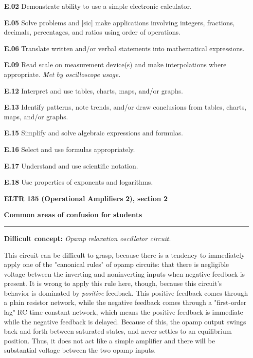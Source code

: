 \item{\bf E.02} Demonstrate ability to use a simple electronic calculator.
\item{\bf E.05} Solve problems and [sic] make applications involving integers, fractions, decimals, percentages, and ratios using order of operations.
\item{\bf E.06} Translate written and/or verbal statements into mathematical expressions.
\item{\bf E.09} Read scale on measurement device(s) and make interpolations where appropriate.  {\it Met by oscilloscope usage.}
\item{\bf E.12} Interpret and use tables, charts, maps, and/or graphs.
\item{\bf E.13} Identify patterns, note trends, and/or draw conclusions from tables, charts, maps, and/or graphs.
\item{\bf E.15} Simplify and solve algebraic expressions and formulas.
\item{\bf E.16} Select and use formulas appropriately.
\item{\bf E.17} Understand and use scientific notation.
\item{\bf E.18} Use properties of exponents and logarithms.
\medskip




\vfil \eject

\centerline{\bf ELTR 135 (Operational Amplifiers 2), section 2} \bigskip 
 
\vskip 10pt

\noindent
{\bf Common areas of confusion for students}

\vskip 5pt


\hrule \vskip 5pt

\vskip 10pt

\noindent
{\bf Difficult concept: } {\it Opamp relaxation oscillator circuit.}

This circuit can be difficult to grasp, because there is a tendency to immediately apply one of the "canonical rules" of opamp circuits: that there is negligible voltage between the inverting and noninverting inputs when negative feedback is present.  It is wrong to apply this rule here, though, because this circuit's behavior is dominated by {\it positive} feedback.  This positive feedback comes through a plain resistor network, while the negative feedback comes through a "first-order lag" RC time constant network, which means the positive feedback is immediate while the negative feedback is delayed.  Because of this, the opamp output swings back and forth between saturated states, and never settles to an equilibrium position.  Thus, it does not act like a simple amplifier and there will be substantial voltage between the two opamp inputs.  

